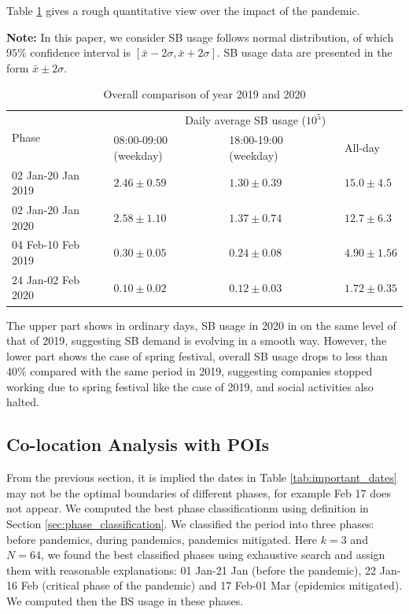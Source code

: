 \documentclass[preprints,ijgi,submit,moreauthors]{Definitions/mdpi}
\begin{document}
Table \ref{tab:overall_comparison} gives a rough quantitative view over the impact of the pandemic.

\textbf{Note:} In this paper, we consider SB usage follows normal distribution, of which $95\%$ confidence interval is $[\bar{x}-2\sigma,\bar{x}+2\sigma]$.
SB usage data are presented in the form $\bar{x}\pm2\sigma$.

\begin{table}[ht]
    \centering
    \begin{tabular}{|l|l|l|l|}
        \hline
        \multirow{2}{*}{Phase} &\multicolumn{3}{c|}{Daily average SB usage ($10^{5}$)}\\
        \cline{2-4}
        & 08:00-09:00 (weekday) & 18:00-19:00 (weekday) & All-day\\
        \hline
        02 Jan-20 Jan 2019 & $2.46\pm0.59$ & $1.30\pm0.39$ & $15.0\pm4.5$\\
        \hline
        02 Jan-20 Jan 2020 & $2.58\pm1.10$ & $1.37\pm0.74$ & $12.7\pm6.3$\\
        \hline
        \hline
        04 Feb-10 Feb 2019 & $0.30\pm0.05$ & $0.24\pm0.08$ & $4.90\pm1.56$\\
        \hline
        24 Jan-02 Feb 2020 & $0.10\pm0.02$ & $0.12\pm0.03$ & $1.72\pm0.35$\\
        \hline
    \end{tabular}
    \caption{Overall comparison of year 2019 and 2020}\label{tab:overall_comparison}
\end{table}

The upper part shows in ordinary days, SB usage in 2020 in on the same level of that of 2019, suggesting SB demand is evolving in a smooth way.
However, the lower part shows the case of spring festival, overall SB usage drops to less than 40\% compared with the same period in 2019, suggesting companies stopped working due to spring festival like the case of 2019, and social activities also halted. 

\subsection{Co-location Analysis with POIs}\label{sec:colo-poi}

From the previous section, it is implied the dates in Table \ref{tab:important_dates} may not be the optimal boundaries of different phases, for example Feb 17 does not appear.
We computed the best phase classificationm using definition in Section \ref{sec:phase_classification}.
We classified the period into three phases: before pandemics, during pandemics, pandemics mitigated.
Here $k=3$ and $N=64$, we found the best classified phases using exhaustive search and assign them with reasonable explanations: 01 Jan-21 Jan (before the pandemic), 22 Jan-16 Feb (critical phase of the pandemic) and 17 Feb-01 Mar (epidemics mitigated).
We computed then the BS usage in these phases.
\end{document}
